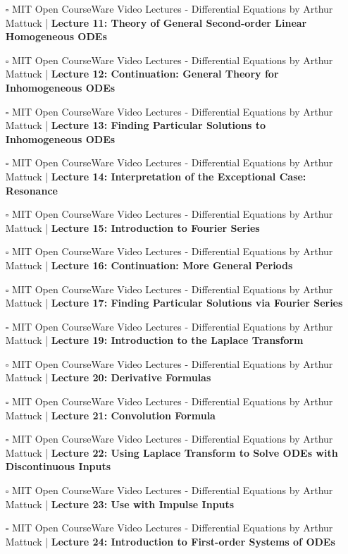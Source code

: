 \documentclass[a4, landscape, 12pt]{article}
\newcommand{\checkbox}{$\square$}%
\begin{document}
\begin{itemize}
{}
\item [\checkbox] MIT Open CourseWare Video Lectures - Differential Equations by Arthur Mattuck  | \textbf{Lecture 11: Theory of General Second-order Linear Homogeneous ODEs
}
\item [\checkbox] MIT Open CourseWare Video Lectures - Differential Equations by Arthur Mattuck  | \textbf{Lecture 12: Continuation: General Theory for Inhomogeneous ODEs
}
\item [\checkbox] MIT Open CourseWare Video Lectures - Differential Equations by Arthur Mattuck  | \textbf{Lecture 13: Finding Particular Solutions to Inhomogeneous ODEs
}
\item [\checkbox] MIT Open CourseWare Video Lectures - Differential Equations by Arthur Mattuck  | \textbf{Lecture 14: Interpretation of the Exceptional Case: Resonance
}
\item [\checkbox] MIT Open CourseWare Video Lectures - Differential Equations by Arthur Mattuck  | \textbf{Lecture 15: Introduction to Fourier Series
}
\item [\checkbox] MIT Open CourseWare Video Lectures - Differential Equations by Arthur Mattuck  | \textbf{Lecture 16: Continuation: More General Periods
}
\item [\checkbox] MIT Open CourseWare Video Lectures - Differential Equations by Arthur Mattuck  | \textbf{Lecture 17: Finding Particular Solutions via Fourier Series
}
\item [\checkbox] MIT Open CourseWare Video Lectures - Differential Equations by Arthur Mattuck  | \textbf{Lecture 19: Introduction to the Laplace Transform
}
\item [\checkbox] MIT Open CourseWare Video Lectures - Differential Equations by Arthur Mattuck  | \textbf{Lecture 20: Derivative Formulas
}
\item [\checkbox] MIT Open CourseWare Video Lectures - Differential Equations by Arthur Mattuck  | \textbf{Lecture 21: Convolution Formula
}
\item [\checkbox] MIT Open CourseWare Video Lectures - Differential Equations by Arthur Mattuck  | \textbf{Lecture 22: Using Laplace Transform to Solve ODEs with Discontinuous Inputs
}
\item [\checkbox] MIT Open CourseWare Video Lectures - Differential Equations by Arthur Mattuck  | \textbf{Lecture 23: Use with Impulse Inputs
}
\item [\checkbox] MIT Open CourseWare Video Lectures - Differential Equations by Arthur Mattuck  | \textbf{Lecture 24: Introduction to First-order Systems of ODEs
}
\end{itemize}
\end{document}
